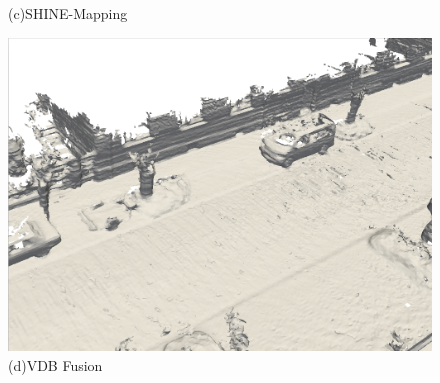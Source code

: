 \begin{figure}[htbp]
\begin{minipage}{0.5\linewidth}
        \caption*{(c)SHINE-Mapping}
	\end{minipage}\hfill
    \begin{minipage}{0.5\linewidth}
		\centering
		\includegraphics[width=1\linewidth]{figures/kitti_3_vdb.png}
        \caption*{(d)VDB Fusion}
	\end{minipage}
\end{figure}

